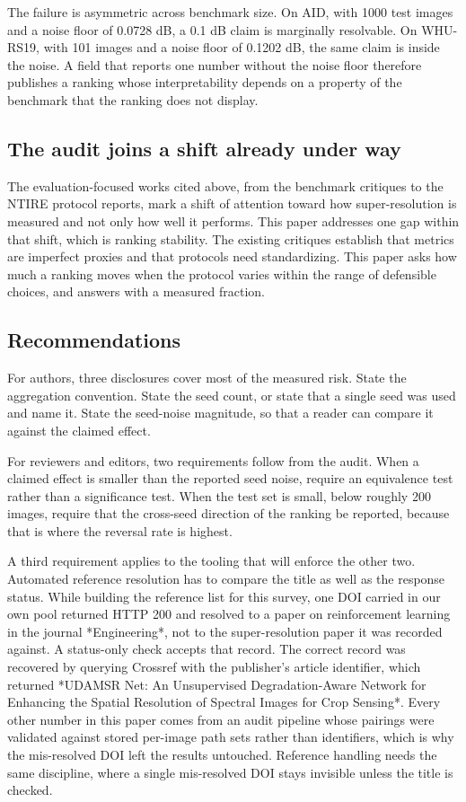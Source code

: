 \documentclass[journal,twoside,10pt]{IEEEtran}
\begin{document}
The failure is asymmetric across benchmark size. On AID, with 1000 test images and a noise floor of 0.0728 dB, a 0.1 dB claim is marginally resolvable. On WHU-RS19, with 101 images and a noise floor of 0.1202 dB, the same claim is inside the noise. A field that reports one number without the noise floor therefore publishes a ranking whose interpretability depends on a property of the benchmark that the ranking does not display.

\subsection{The audit joins a shift already under way}


The evaluation-focused works cited above, from the benchmark critiques to the NTIRE protocol reports, mark a shift of attention toward how super-resolution is measured and not only how well it performs. This paper addresses one gap within that shift, which is ranking stability. The existing critiques establish that metrics are imperfect proxies and that protocols need standardizing. This paper asks how much a ranking moves when the protocol varies within the range of defensible choices, and answers with a measured fraction.

\subsection{Recommendations}


For authors, three disclosures cover most of the measured risk. State the aggregation convention. State the seed count, or state that a single seed was used and name it. State the seed-noise magnitude, so that a reader can compare it against the claimed effect.

For reviewers and editors, two requirements follow from the audit. When a claimed effect is smaller than the reported seed noise, require an equivalence test rather than a significance test. When the test set is small, below roughly 200 images, require that the cross-seed direction of the ranking be reported, because that is where the reversal rate is highest.

A third requirement applies to the tooling that will enforce the other two. Automated reference resolution has to compare the title as well as the response status. While building the reference list for this survey, one DOI carried in our own pool returned HTTP 200 and resolved to a paper on reinforcement learning in the journal *Engineering*, not to the super-resolution paper it was recorded against. A status-only check accepts that record. The correct record was recovered by querying Crossref with the publisher's article identifier, which returned *UDAMSR Net: An Unsupervised Degradation-Aware Network for Enhancing the Spatial Resolution of Spectral Images for Crop Sensing*. Every other number in this paper comes from an audit pipeline whose pairings were validated against stored per-image path sets rather than identifiers, which is why the mis-resolved DOI left the results untouched. Reference handling needs the same discipline, where a single mis-resolved DOI stays invisible unless the title is checked.
\end{document}

